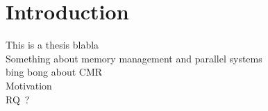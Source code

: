 \chapter{Introduction}

This is a thesis blabla
\\
Something about memory management and parallel systems
\\
bing bong about CMR
\\
Motivation
\\
RQ\ ?
